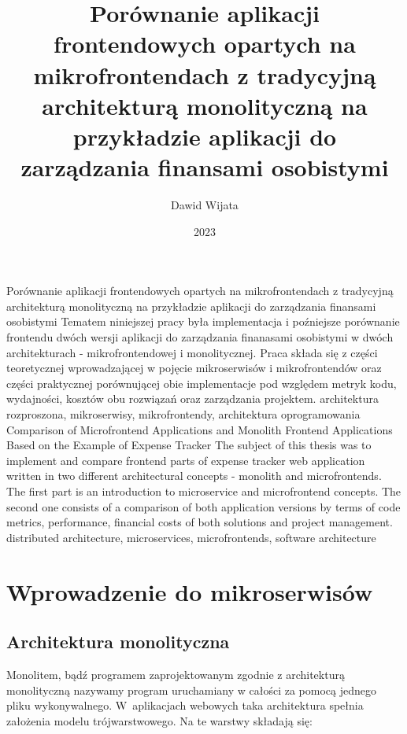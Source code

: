 \documentclass{SGGW-thesis}
\title{Porównanie aplikacji frontendowych opartych na mikrofrontendach z tradycyjną architekturą monolityczną na przykładzie aplikacji do zarządzania finansami osobistymi}
\author{Dawid Wijata}
\date{2023}
\begin{document}

\maketitle
\statementpage
\abstractpage
{Porównanie aplikacji frontendowych opartych na mikrofrontendach z tradycyjną architekturą monolityczną na przykładzie aplikacji do zarządzania finansami osobistymi}
{Tematem niniejszej pracy była implementacja i poźniejsze porównanie frontendu dwóch wersji aplikacji do zarządzania finanasami osobistymi w dwóch architekturach - mikrofrontendowej i monolitycznej. Praca składa się z części teoretycznej wprowadzającej w pojęcie mikroserwisów i mikrofrontendów oraz części praktycznej porównującej obie implementacje pod względem metryk kodu, wydajności, kosztów obu rozwiązań oraz zarządzania projektem.}
{architektura rozproszona, mikroserwisy, mikrofrontendy, architektura oprogramowania}
{Comparison of Microfrontend Applications and Monolith Frontend Applications Based on the Example of Expense Tracker}
{The subject of this thesis was to implement and compare frontend parts of expense tracker web application written in two different architectural concepts - monolith and microfrontends. The first part is an introduction to microservice and microfrontend concepts. The second one consists of a comparison of both application versions by terms of code metrics, performance, financial costs of both solutions and project management.}
{distributed architecture, microservices, microfrontends, software architecture}



{
	\doublespacing
	\tableofcontents
}

\startchapterfromoddpage %

\chapter{Wprowadzenie do mikroserwisów}
\section{Architektura monolityczna}
Monolitem, bądź programem zaprojektowanym zgodnie z architekturą monolityczną nazywamy program uruchamiany w całości za pomocą jednego pliku wykonywalnego. W~aplikacjach webowych taka architektura spełnia założenia modelu trójwarstwowego. Na te warstwy składają się:
\end{document}
